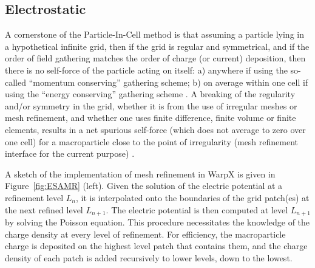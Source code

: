 \subsection{Electrostatic}
A cornerstone of the Particle-In-Cell method is that assuming a particle lying in a hypothetical infinite grid, then if the grid is regular and symmetrical, and if the order of field gathering matches the order of charge (or current) deposition, then there is no self-force of the particle acting on itself: a) anywhere if using the so-called ``momentum conserving'' gathering scheme; b) on average within one cell if using the ``energy conserving'' gathering scheme \cite{Birdsalllangdon}. A breaking of the regularity and/or symmetry in the grid, whether it is from the use of irregular meshes or mesh refinement, and whether one uses finite difference, finite volume or finite elements, results in a net spurious self-force (which does not average to zero over one cell)  for a macroparticle close to the point of irregularity (mesh refinement interface for the current purpose) \cite{Vaylpb2002,Colellajcp2010}. 

A sketch of the implementation of mesh refinement in WarpX is given in Figure~\ref{fig:ESAMR} (left). Given the solution of the electric potential at a refinement level $L_n$, it is interpolated onto the boundaries of the grid patch(es) at the next refined level $L_{n+1}$. The electric potential is then computed at level $L_{n+1}$ by solving the Poisson equation. This procedure necessitates the knowledge of the charge density at every level of refinement. For efficiency, the macroparticle charge is deposited on the highest level patch that contains them, and the charge density of each patch is added recursively to lower levels, down to the lowest. 

